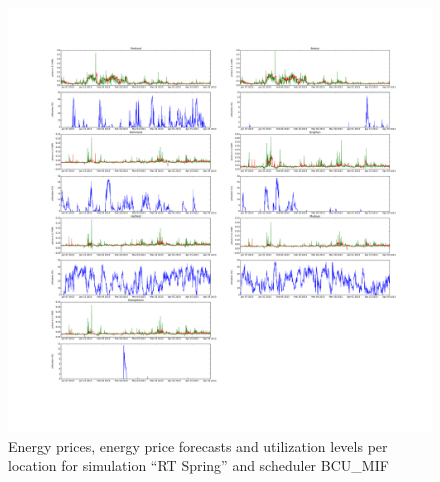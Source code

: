 \begin{figure}[htbp]
	\centering
	\vspace*{-0.6in}
	\hspace*{-1.4in}
		\includegraphics[width=1.60\textwidth]{figures/appendix_simulation_results/RT_Spring_scenario_7.pdf}
	\vspace*{-1.0in}
	\caption{Energy prices, energy price forecasts and utilization levels per location for simulation ``RT Spring'' and scheduler BCU\_MIF}
	\label{fig:app_RT_Spring_scenario_7}
\end{figure}


